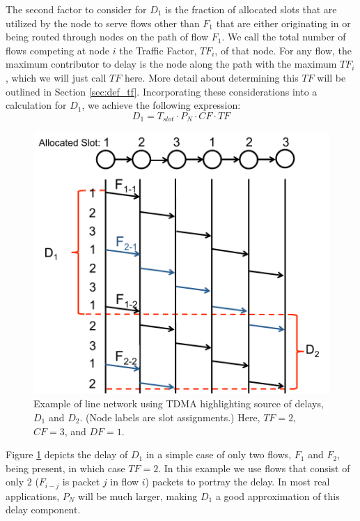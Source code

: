 The second factor to consider for $D_1$ is the fraction of allocated slots that are utilized by the node to serve flows other than $F_1$ that are either originating in or being routed through nodes on the path of flow $F_1$.  We call the total number of flows competing at node $i$ the Traffic Factor, $TF_i$, of that node.  For any flow, the maximum contributor to delay is the node along the path with the maximum $TF_i$, which we will just call $TF$ here.  More detail about determining this $TF$ will be outlined in Section \ref{sec:def_tf}.  Incorporating these considerations into a calculation for $D_1$, we achieve the following expression:  %
\begin{equation}
	D_1 = T_{slot} \cdot P_N \cdot CF \cdot TF
\end{equation}

\begin{figure}
\begin{centering}
    \includegraphics[scale=0.33]{figures/delay_limit_expl/fig_1_2.pdf}
    \caption{Example of line network using TDMA highlighting source of delays, $D_1$ and $D_2$.  (Node labels are slot assignments.)  Here, $TF = 2$, $CF = 3$, and $DF = 1$. }
    \label{fig:delay_expl_fig_3}
\end{centering}
\end{figure}

Figure \ref{fig:delay_expl_fig_3} depicts the delay of $D_1$ in a simple case of only two flows, $F_1$ and $F_2$, being present, in which case $TF = 2$.  In this example we use flows that consist of only $2$ ($F_{i-j}$ is packet $j$ in flow $i$) packets to portray the delay.  In most real applications, $P_N$ will be much larger, making $D_1$ a good approximation of this delay component.

